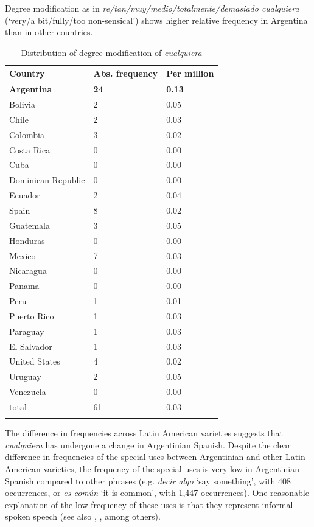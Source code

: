 {Degree modification as in \textit{re/tan/muy/medio/totalmente/demasiado cualquiera} (‘very/a bit/fully/too non-sensical’) shows higher relative frequency in Argentina than in other countries}.   

\begin{table}[t]
\begin{tabularx}{.8\textwidth}{lYY}
    \lsptoprule
    Country & Abs. frequency & Per million \\
\midrule
    \textbf{Argentina} & \textbf{24} & \textbf{0.13} \\
    Bolivia & 2 & 0.05 \\
    Chile & 2 & 0.03 \\
    Colombia & 3 & 0.02 \\
    Costa Rica & 0 & 0.00 \\
    Cuba & 0 & 0.00 \\
    Dominican Republic & 0 & 0.00 \\
    Ecuador & 2 & 0.04 \\
    Spain & 8 & 0.02 \\
    Guatemala & 3 & 0.05 \\
    Honduras & 0 & 0.00 \\
    Mexico & 7 & 0.03 \\
    Nicaragua & 0 & 0.00 \\
    Panama & 0 & 0.00 \\
    Peru & 1 & 0.01 \\
    Puerto Rico & 1 & 0.03 \\
    Paraguay & 1 & 0.03 \\
    El Salvador & 1 & 0.03 \\
    United States & 4 & 0.02 \\
    Uruguay & 2 & 0.05 \\
    Venezuela & 0 & 0.00 \\
\midrule
    total & 61 & 0.03 \\
\lspbottomrule
\end{tabularx}
\caption{\label{tab:distribution-degree} Distribution of degree modification of \textit{cualquiera}}
\end{table}

\largerpage[1.5]
The difference in frequencies across Latin American varieties suggests that \textit{cualquiera} has undergone a change in Argentinian Spanish. Despite the clear difference in frequencies of the special uses between Argentinian and other Latin American varieties, the frequency of the special uses is very low in Argentinian Spanish compared to other phrases (e.g. \textit{decir algo} ‘say something’, with 408 occurrences, or \textit{es común} ‘it is common’, with 1,447 occurrences). One reasonable explanation of the low frequency of these uses is that they represent informal spoken speech (see also \citealt{Rizzosalierno2013}, \citealt{Conde2011}, among others).

